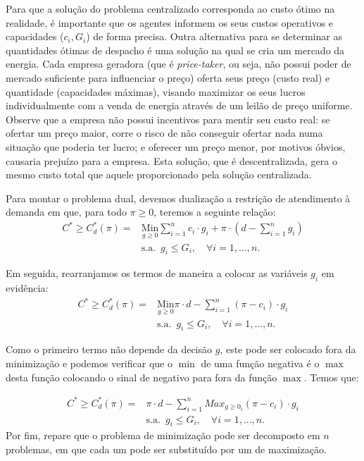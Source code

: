Para que a solução do problema centralizado corresponda ao custo ótimo na realidade, é importante que os
agentes informem os seus custos operativos e capacidades ($c_{i},G_{i}$) de forma precisa.
Outra alternativa para se determinar as quantidades ótimas de despacho é uma solução na qual se cria um mercado 
da energia. Cada empresa geradora (que é \textit{price-taker}, ou seja, não possui poder de mercado suficiente para influenciar o preço) oferta seus preço (custo real) e quantidade (capacidades máximas), visando maximizar os seus lucros individualmente com a venda de energia através de um leilão de preço uniforme. Observe que a empresa não possui incentivos para mentir seu custo real: se ofertar um preço maior, corre o risco de não conseguir ofertar nada numa situação que poderia ter lucro; e oferecer um preço menor, por motivos óbvios, causaria prejuízo para a empresa. 
Esta solução, que é descentralizada, gera o mesmo custo total que aquele proporcionado pela solução centralizada.

Para montar o problema dual, devemos dualização a restrição de atendimento à demanda em que, para todo $\pi\geq0$, teremos a seguinte relação:
\begin{align*}C^{*}\geq C_{d}^{*}(\pi)= & \underset{g\geq0}{\mbox{Min}}\sum_{i=1}^{n}c_{i}\cdot g_{i}+\pi\cdot\left(d-\sum_{i=1}^{n}g_{i}\right)\\
 & \mbox{s.a. }\,g_{i}\leq G_{i}, \quad \forall i=1,...,n.
\end{align*}

Em seguida, rearranjamos os termos de maneira a colocar as variáveis $g_{i}$ em evidência:
\begin{align*}C^{*}\geq C_{d}^{*}(\pi)= & \underset{g\geq0}{\mbox{Min}}\pi\cdot d-\sum_{i=1}^{n}(\pi-c_{i})\cdot g_{i}\\
 & \mbox{s.a. }\,g_{i}\leq G_{i}, \quad \forall i=1,...,n.
\end{align*}

Como o primeiro termo não depende da decisão $g$, este pode ser colocado fora da  minimização e podemos verificar que o $\min$ de uma função negativa é o $\max$ desta função colocando o sinal de negativo para fora da função $\max$. Temos que:

\begin{align*}C^{*}\geq C_{d}^{*}(\pi)= & \pi\cdot d-\sum_{i=1}^{n}Max_{g\geq0_{i}}(\pi-c_{i})\cdot g_{i}\\
 & \mbox{s.a. }\,g_{i}\leq G_{i}, \quad \forall i=1,...,n.
\end{align*}
Por fim, repare que o problema de minimização pode ser decomposto
em $n$ problemas, em que cada um pode ser substituído por um de maximização.


